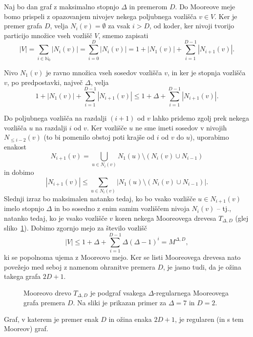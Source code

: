 \documentclass[fin1, tisk]{fmfdelo}
\begin{document}
\begin{dokaz}
   Naj bo dan graf z maksimalno stopnjo $\Delta$ in premerom $D$. Do Mooreove meje bomo prispeli z opazovanjem nivojev 
   nekega poljubnega vozlišča $v\in V$. Ker je premer grafa $D$, velja $N_i(v) = \emptyset$ za vsak $i > D$,
   od koder, ker nivoji tvorijo particijo množice vseh vozlišč $V$, 
   smemo zapisati 
   $$|V| = \sum_{i\in\mathbb{N}_0} |N_i(v)| = \sum_{i=0}^D |N_i(v)| = 1 + |N_1(v)| + \sum_{i=1}^{D-1} |N_{i+1}(v)|.$$

   Nivo $N_1(v)$ je ravno množica vseh sosedov vozlišča $v$, in ker je stopnja vozlišča $v$, po predpostavki, največ $\Delta$,
   velja $$1 + |N_1(v)| + \sum_{i=1}^{D-1} |N_{i+1}(v)|\leq 1 + \Delta + \sum_{i=1}^{D-1} |N_{i+1}(v)|.$$

   Do poljubnega vozlišča na razdalji $(i+1)$ od $v$ lahko pridemo zgolj prek nekega vozlišča $u$ na razdalji $i$ od $v$. 
   Ker vozlišče $u$ ne sme imeti sosedov v nivojih $N_{\leq i-2}(v)$ (to bi pomenilo obstoj poti krajše od $i$ od $v$ do $u$), uporabimo enakost
   \[N_{i+1}(v) = \bigcup_{u \in N_i(v)} N_1(u) \setminus \left( N_i(v)\cup N_{i-1} \right)\]
   in dobimo 
   \[|N_{i+1}(v)| \leq \sum_{u \in N_i(v)} |N_1(u) \setminus \left( N_i(v)\cup N_{i-1} \right)|.\]
   Slednji izraz bo maksimalen natanko tedaj, ko bo vsako vozlišče $u \in N_{i+1}(v)$ imelo stopnjo $\Delta$ in bo sosedno z enim samim vozliščem nivoja $N_{i}(v)$ --
   tj., natanko tedaj, ko je vsako vozlišče $v$ koren nekega Mooreovega drevesa $T_{\Delta, D}$ (glej sliko~\ref{fig:drevo_moore_uvod}).
   Dobimo zgornjo mejo za število vozlišč
   $$|V| \leq 1 + \Delta + \sum_{i=1}^{D-1} \Delta (\Delta - 1)^i = M^{\Delta, D},$$
   ki se popolnoma ujema z Mooreovo mejo. Ker se listi Mooreovega drevesa nato povežejo med seboj z namenom ohranitve premera $D$,
   je jasno tudi, da je ožina takega grafa $2D+1$.
\end{dokaz}

\begin{figure}[ht]
    \centering
    \def\svgwidth{\columnwidth}
    \caption{Mooreovo drevo $T_{\Delta, D}$ je podgraf vsakega 
    $\Delta$-regularnega Mooreovega grafa premera $D$.
    Na sliki je prikazan primer za $\Delta = 7$ in $D=2$.}
    \label{fig:drevo_moore_uvod}
\end{figure}

\begin{trditev}\label{tr:diam_girth_regular}
    Graf, v katerem je premer enak $D$ in ožina enaka $2D+1$, je regularen (in s tem Mooreov) graf.
\end{trditev}
\end{document}
